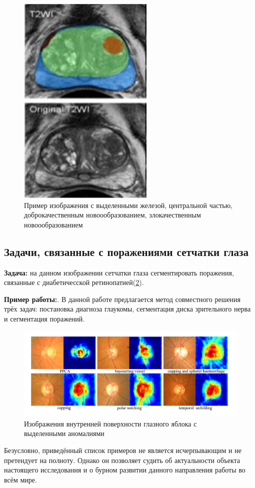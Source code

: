 \begin{figure}[h] 
  \center
  \includegraphics [scale=0.8] {images/prostate.png}
  \caption{ Пример изображения с выделенными {\color{blue} железой}, {\color{green} центральной частью}, {\color{orange} доброкачественным новоообразованием}, {\color{red} злокачественным новоообразованием} \cite{prostate-cancer} } 
  \label{fig:prostate}  
\end{figure}



\subsection{Задачи, связанные с поражениями сетчатки глаза}

{\bf Задача:} на данном изображении сетчатки глаза сегментировать поражения, связанные с диабетичесской ретинопатией(\ref{fig:retina}).

{\bf Пример работы:}\cite{retinopathy}. В данной работе предлагается метод совместного решения трёх задач: постановка диагноза глаукомы, сегментация диска зрительного нерва и сегментация поражений.

\begin{figure}[h] 
  \center
  \includegraphics [scale=0.8] {images/glaucoma.png}
  \caption{ Изображения внутренней поверхности глазного яблока с выделенными аномалиями} 
  \label{fig:retina}  
\end{figure}


Безусловно, приведённый список примеров не является исчерпывающим и не претендует на полноту. Однако он позволяет судить об актуальности объекта настоящего исследования и о бурном развитии данного направления работы во всём мире.

